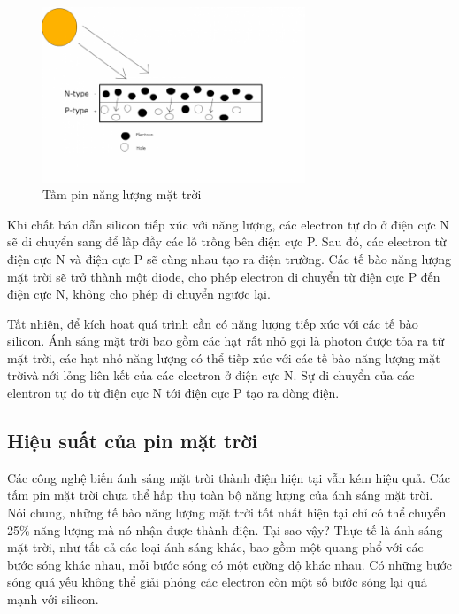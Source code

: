 \begin{center}
\begin{figure}[htp]
\centering    
\includegraphics[width=0.7\textwidth]{solarpanel_hinhthanhdientich}
\caption[Tấm pin năng lượng mặt trời]{Tấm pin năng lượng mặt trời}
\label{fig:solarpanel_hinhthanhdientich}
\end{figure}
\end{center}


Khi chất bán dẫn silicon tiếp xúc với năng lượng, các electron tự do ở điện cực N sẽ di chuyển sang để lấp đầy các lỗ trống bên điện cực P. Sau đó, các electron từ điện cực N và điện cực P sẽ cùng nhau tạo ra điện trường. Các tế bào năng lượng mặt trời sẽ trở thành một diode, cho phép electron di chuyển từ điện cực P đến điện cực N, không cho phép di chuyển ngược lại.

Tất nhiên, để kích hoạt quá trình cần có năng lượng tiếp xúc với các tế bào silicon. Ánh sáng mặt trời bao gồm các hạt rất nhỏ gọi là photon được tỏa ra từ mặt trời, các hạt nhỏ năng lượng có thể tiếp xúc với các tế bào năng lượng mặt trờivà nới lỏng liên kết của các electron ở điện cực N. Sự di chuyển của các elentron tự do từ điện cực N tới điện cực P tạo ra dòng điện.





\subsection*{Hiệu suất của pin mặt trời}
Các công nghệ biến ánh sáng mặt trời thành điện hiện tại vẫn kém hiệu quả. Các tấm pin mặt trời chưa thể hấp thụ toàn bộ năng lượng của ánh sáng mặt trời. Nói chung, những tế bào năng lượng mặt trời tốt nhất hiện tại chỉ có thể chuyển 25\% năng lượng mà nó nhận được thành điện. Tại sao vậy? Thực tế là ánh sáng mặt trời, như tất cả các loại ánh sáng khác, bao gồm một quang phổ với các bước sóng khác nhau, mỗi bước sóng có một cường độ khác nhau. Có những bước sóng quá yếu không thể giải phóng các electron còn một số bước sóng lại quá mạnh với silicon.


